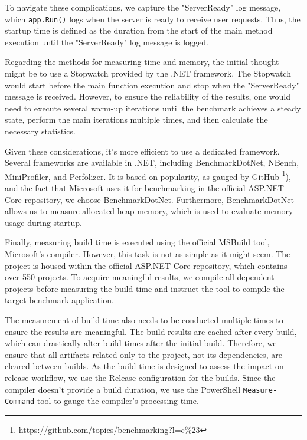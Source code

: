 To navigate these complications, we capture the "ServerReady" log message, which \texttt{app.Run()} logs when the server is ready to receive user requests. Thus, the startup time is defined as the duration from the start of the main method execution until the "ServerReady" log message is logged.

Regarding the methods for measuring time and memory, the initial thought might be to use a Stopwatch provided by the .NET framework. The Stopwatch would start before the main function execution and stop when the "ServerReady" message is received. However, to ensure the reliability of the results, one would need to execute several warm-up iterations until the benchmark achieves a steady state, perform the main iterations multiple times, and then calculate the necessary statistics.

Given these considerations, it's more efficient to use a dedicated framework. Several frameworks are available in .NET, including BenchmarkDotNet, NBench, MiniProfiler, and Perfolizer. It is based on popularity, as gauged by \href{https://github.com/topics/benchmarking?l=c%23}{GitHub} \footnote{\url{https://github.com/topics/benchmarking?l=c\%23}}), and the fact that Microsoft uses it for benchmarking in the official ASP.NET Core repository, we choose BenchmarkDotNet. Furthermore, BenchmarkDotNet allows us to measure allocated heap memory, which is used to evaluate memory usage during startup.

Finally, measuring build time is executed using the official MSBuild tool, Microsoft's compiler. However, this task is not as simple as it might seem. The project is housed within the official ASP.NET Core repository, which contains over 550 projects. To acquire meaningful results, we compile all dependent projects before measuring the build time and instruct the tool to compile the target benchmark application.

The measurement of build time also needs to be conducted multiple times to ensure the results are meaningful. The build results are cached after every build, which can drastically alter build times after the initial build. Therefore, we ensure that all artifacts related only to the project, not its dependencies, are cleared between builds. As the build time is designed to assess the impact on release workflow, we use the Release configuration for the builds. Since the compiler doesn't provide a build duration, we use the PowerShell \texttt{Measure-Command} tool to gauge the compiler's processing time.

